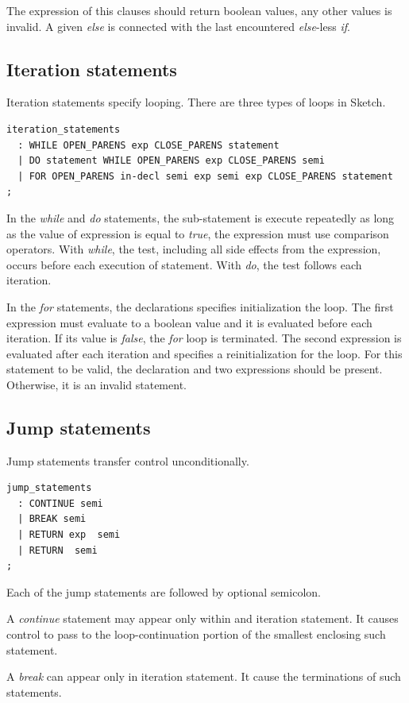 \documentclass{l3proj}
\begin{document}
The expression of this clauses should return boolean values, any other values is invalid. A given \textit{else} is connected with the last encountered \textit{else}-less \textit{if}. 

\subsection{Iteration statements}
Iteration statements specify looping. There are three types of loops in Sketch. 
\begin{lstlisting}
iteration_statements  
  : WHILE OPEN_PARENS exp CLOSE_PARENS statement
  | DO statement WHILE OPEN_PARENS exp CLOSE_PARENS semi
  | FOR OPEN_PARENS in-decl semi exp semi exp CLOSE_PARENS statement
;
\end{lstlisting}
In the \textit{while} and \textit{do} statements, the sub-statement is execute repeatedly as long as the value of expression is equal to \textit{true}, the expression must use comparison operators. With \textit{while}, the test, including all side effects from the expression, occurs before each execution of statement. With \textit{do}, the test follows each iteration. 

In the \textit{for} statements, the declarations specifies initialization the loop. The first expression must evaluate to a boolean value and it is evaluated before each iteration. If its value is \textit{false}, the \textit{for} loop is terminated. The second expression is evaluated after each iteration and specifies a reinitialization for the loop. For this statement to be valid, the declaration and two expressions should be present. Otherwise, it is an invalid statement. 
\subsection{Jump statements} 
Jump statements transfer control unconditionally. 
\begin{lstlisting}
jump_statements 
  : CONTINUE semi
  | BREAK semi 
  | RETURN exp  semi 
  | RETURN  semi 
;
\end{lstlisting}
Each of the jump statements are followed by optional semicolon. 

A \textit{continue} statement may appear only within and iteration statement. It causes control to pass to the loop-continuation portion of the smallest enclosing such statement.

A \textit{break} can appear only in iteration statement. It cause the terminations of such statements. 
\end{document}
